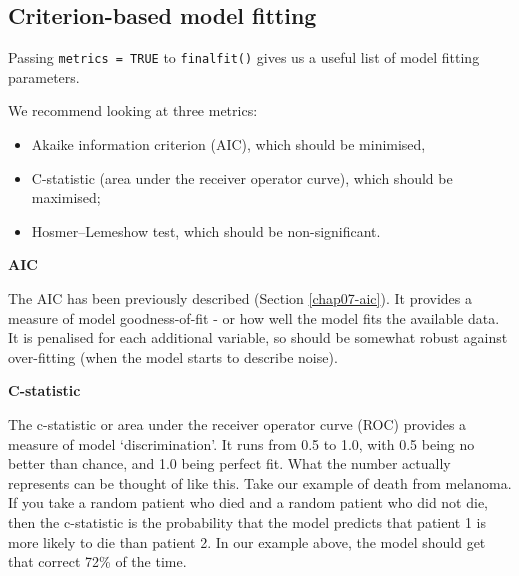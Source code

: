 \documentclass[
  12pt,
  krantz2]{krantz}
\providecommand{\tightlist}{%
  \setlength{\itemsep}{0pt}\setlength{\parskip}{0pt}}
\begin{document}
\begin{table}[!h]

\caption{\label{tab:unnamed-chunk-18}Model metrics: 5-year survival from malignant melanoma by tumour ulceration (fit 1).}
\centering
{}
\end{table}

\hypertarget{criterion-based-model-fitting}{%
\subsection{Criterion-based model fitting}\label{criterion-based-model-fitting}}

Passing \texttt{metrics\ =\ TRUE} to \texttt{finalfit()} gives us a useful list of model fitting parameters.

We recommend looking at three metrics:

\begin{itemize}
\tightlist
\item
  Akaike information criterion (AIC), which should be minimised,
\item
  C-statistic (area under the receiver operator curve), which should be maximised;
\item
  Hosmer--Lemeshow test, which should be non-significant.
\end{itemize}

\newpage

\textbf{AIC}

The AIC has been previously described (Section \ref{chap07-aic}).
It provides a measure of model goodness-of-fit - or how well the model fits the available data.
It is penalised for each additional variable, so should be somewhat robust against over-fitting (when the model starts to describe noise).

\textbf{C-statistic}

The c-statistic or area under the receiver operator curve (ROC) provides a measure of model `discrimination'.
It runs from 0.5 to 1.0, with 0.5 being no better than chance, and 1.0 being perfect fit.
What the number actually represents can be thought of like this.
Take our example of death from melanoma.
If you take a random patient who died and a random patient who did not die, then the c-statistic is the probability that the model predicts that patient 1 is more likely to die than patient 2.
In our example above, the model should get that correct 72\% of the time.
\end{document}
